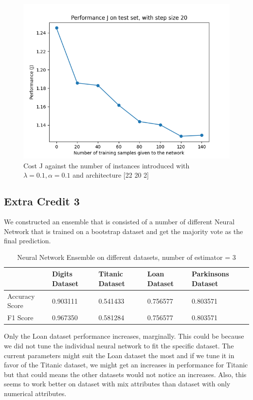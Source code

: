 \documentclass[letterpaper]{article}
\begin{document}
\begin{figure}[H]
	\includegraphics[width=\textwidth]{figures/nn_parkinsons.csv_cost.png}
	\caption{Cost J against the number of instances introduced with $\lambda=0.1, \alpha=0.1$ and architecture [22 20 2]}
	\label{fig:nn-parkinsons}
\end{figure}

\subsection*{Extra Credit 3}

We constructed an ensemble that is consisted of a number of different Neural Network that is trained on a bootstrap dataset and get the majority vote
as the final prediction.

\begin{table}[H]
	\centering
	\begin{tabular}{|l|l|l|l|l|}
		\hline
		               & Digits Dataset & Titanic Dataset & Loan Dataset & Parkinsons Dataset \\ \hline
		Accuracy Score & 0.903111       & 0.541433        & 0.756577     & 0.803571           \\ \hline
		F1 Score       & 0.967350       & 0.581284        & 0.756577     & 0.803571           \\ \hline
	\end{tabular}
	\caption{Neural Network Ensemble on different datasets, number of estimator = 3}
\end{table}

Only the Loan dataset performance increases, marginally. This could be because we did not tune the individual neural network to fit the specific dataset.
The current parameters might suit the Loan dataset the most and if we tune it in favor of the Titanic dataset, we might get an increases in performance
for Titanic but that could means the other datasets would not notice an increases. Also, this seems to work better on dataset with mix attributes than
dataset with only numerical attributes.
\end{document}
